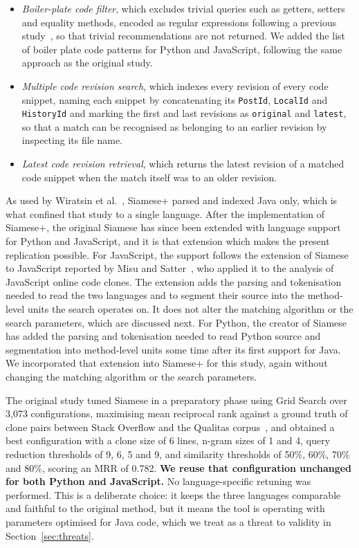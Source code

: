 \documentclass[onecolumn,11pt]{IEEEtran}
\begin{document}
\begin{itemize}
\item \emph{Boiler-plate code filter}, which excludes trivial queries such as getters, setters and equality methods, encoded as regular expressions following a previous study~\cite{ragkhitwetsagul2021toxic}, so that trivial recommendations are not returned. We added the list of boiler plate code patterns for Python and JavaScript, following the same approach as the original study.
\item \emph{Multiple code revision search}, which indexes every revision of every code snippet, naming each snippet by concatenating its \texttt{PostId}, \texttt{LocalId} and \texttt{HistoryId} and marking the first and last revisions as \texttt{original} and \texttt{latest}, so that a match can be recognised as belonging to an earlier revision by inspecting its file name.
\item \emph{Latest code revision retrieval}, which returns the latest revision of a matched code snippet when the match itself was to an older revision. 
\end{itemize}

As used by Wiratsin et al.~\cite{wiratsin2025java}, Siamese+ parsed and indexed Java only, which is what confined that study to a single language.
After the implementation of Siamese+, the original Siamese has since been extended with language support for Python and JavaScript, and it is that extension which makes the present replication possible.
For JavaScript, the support follows the extension of Siamese to JavaScript reported by Misu and Satter~\cite{misu2022javascript}, who applied it to the analysis of JavaScript online code clones.
The extension adds the parsing and tokenisation needed to read the two languages and to segment their source into the method-level units the search operates on. It does not alter the matching algorithm or the search parameters, which are discussed next.
For Python, the creator of Siamese has added the parsing and tokenisation needed to read Python source and segmentation into method-level units some time after its first support for Java. 
We incorporated that extension into Siamese+ for this study, again without changing the matching algorithm or the search parameters.

The original study tuned Siamese in a preparatory phase using Grid Search over 3{,}073 configurations, maximising mean reciprocal rank against a ground truth of clone pairs between Stack Overflow and the Qualitas corpus~\cite{tempero2010qualitas}, and obtained a best configuration with a clone size of 6 lines, n-gram sizes of 1 and 4, query reduction thresholds of 9, 6, 5 and 9, and similarity thresholds of 50\%, 60\%, 70\% and 80\%, scoring an MRR of 0.782.
\textbf{We reuse that configuration unchanged for both Python and JavaScript.}
No language-specific retuning was performed.
This is a deliberate choice: it keeps the three languages comparable and faithful to the original method, but it means the tool is operating with parameters optimised for Java code, which we treat as a threat to validity in Section~\ref{sec:threats}.
\end{document}
